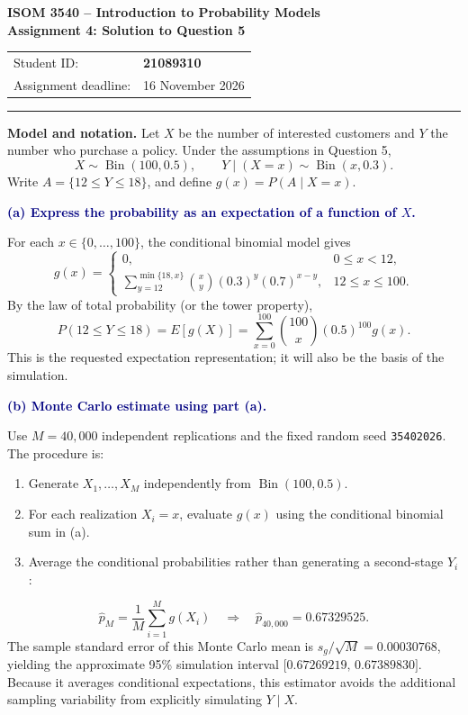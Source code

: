 \documentclass[10pt,a4paper]{article}
\newcommand{\parthead}[1]{\vspace{2pt}\noindent\textcolor{navy}{\bfseries #1}\par\vspace{-2pt}}
\begin{document}
\begin{center}
 {\Large\bfseries ISOM 3540 -- Introduction to Probability Models}\\[4pt]
 {\large\bfseries Assignment 4: Solution to Question 5}\\[6pt]
 \begin{tabular}{@{}ll@{}}
 Student ID: & \textbf{21089310}\\
 Assignment deadline: & 16 November 2026\\
 \end{tabular}
\end{center}
\vspace{2pt}\hrule\vspace{10pt}

\textbf{Model and notation.} Let \(X\) be the number of interested customers and \(Y\) the number who purchase a policy. Under the assumptions in Question 5,
\[
 X\sim\operatorname{Bin}(100,0.5),\qquad
 Y\mid(X=x)\sim\operatorname{Bin}(x,0.3).
\]
Write \(A=\{12\leq Y\leq18\}\), and define \(g(x)=P(A\mid X=x)\).

\parthead{(a) Express the probability as an expectation of a function of \(X\).}
For each \(x\in\{0,\ldots,100\}\), the conditional binomial model gives
\[
 g(x)=
 \begin{cases}
 0, & 0\le x<12,\\[2pt]
 \displaystyle\sum_{y=12}^{\min\{18,x\}}
 {x\choose y}(0.3)^y(0.7)^{x-y}, & 12\le x\le100.
 \end{cases}
\]
By the law of total probability (or the tower property),
\begin{equation}
 \boxed{\;P(12\le Y\le18)=E[g(X)]
 =\sum_{x=0}^{100}{100\choose x}(0.5)^{100}g(x).\;}
 \label{eq:expectation}
\end{equation}
This is the requested expectation representation; it will also be the basis of the simulation.

\parthead{(b) Monte Carlo estimate using part (a).}
Use \(M=40{,}000\) independent replications and the fixed random seed \texttt{35402026}. The procedure is:
\begin{enumerate}[leftmargin=2em,itemsep=1pt,topsep=1pt]
\item Generate \(X_1,\ldots,X_M\) independently from \(\operatorname{Bin}(100,0.5)\).
\item For each realization \(X_i=x\), evaluate \(g(x)\) using the conditional binomial sum in (a).
\item Average the conditional probabilities rather than generating a second-stage \(Y_i\):
\end{enumerate}
\vspace{-8pt}
\[
 \widehat{p}_M=\frac{1}{M}\sum_{i=1}^{M}g(X_i)
 \quad\Longrightarrow\quad
 \boxed{\widehat{p}_{40{,}000}=0.67329525.}
\]
The sample standard error of this Monte Carlo mean is \(s_g/\sqrt{M}=0.00030768\), yielding the approximate 95\% simulation interval
\(\bigl[0.67269219,\,0.67389830\bigr]\). Because it averages conditional expectations, this estimator avoids the additional sampling variability from explicitly simulating \(Y\mid X\).
\end{document}
